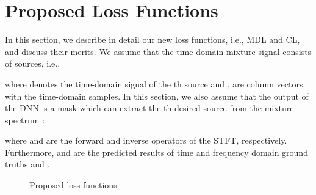 \documentclass{article}
\begin{document}
\section{Proposed Loss Functions}
\label{sec:propose}
In this section, we describe in detail our new loss functions, i.e., MDL and CL, and discuss their merits.
We assume that the time-domain mixture signal  consists of  sources, i.e.,
 
where  denotes the time-domain signal of the th source and ,  are column vectors with the time-domain samples.
In this section, we also assume that the output of the DNN is a mask  which can extract the th desired source from the mixture spectrum :
 
where  and  are the forward and inverse operators of the STFT, respectively.
Furthermore,  and  are the predicted results of time and frequency domain ground truths  and .

\begin{figure*}[t]
\centering
{}
\hspace{+2mm}


\caption{Proposed loss functions}
  \label{fig:overview}
\end{figure*}
\fi
\end{document}
